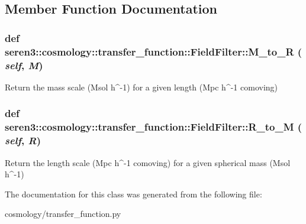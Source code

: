\subsection{Member Function Documentation}
\hypertarget{classseren3_1_1cosmology_1_1transfer__function_1_1FieldFilter_a983db94a6d9f16eff701bcc09bc9224a}{
\subsubsection[{M\_\-to\_\-R}]{\setlength{\rightskip}{0pt plus 5cm}def seren3::cosmology::transfer\_\-function::FieldFilter::M\_\-to\_\-R ( {\em self}, \/   {\em M})}}
\label{classseren3_1_1cosmology_1_1transfer__function_1_1FieldFilter_a983db94a6d9f16eff701bcc09bc9224a}
\begin{DoxyVerb}Return the mass scale (Msol h^-1) for a given length (Mpc h^-1 comoving)\end{DoxyVerb}
 \hypertarget{classseren3_1_1cosmology_1_1transfer__function_1_1FieldFilter_affac12da7c98b51f64935da1c98f4d11}{
\subsubsection[{R\_\-to\_\-M}]{\setlength{\rightskip}{0pt plus 5cm}def seren3::cosmology::transfer\_\-function::FieldFilter::R\_\-to\_\-M ( {\em self}, \/   {\em R})}}
\label{classseren3_1_1cosmology_1_1transfer__function_1_1FieldFilter_affac12da7c98b51f64935da1c98f4d11}
\begin{DoxyVerb}Return the length scale (Mpc h^-1 comoving) for a given spherical mass (Msol h^-1)\end{DoxyVerb}
 

The documentation for this class was generated from the following file:\begin{DoxyCompactItemize}
\item 
cosmology/transfer\_\-function.py\end{DoxyCompactItemize}
